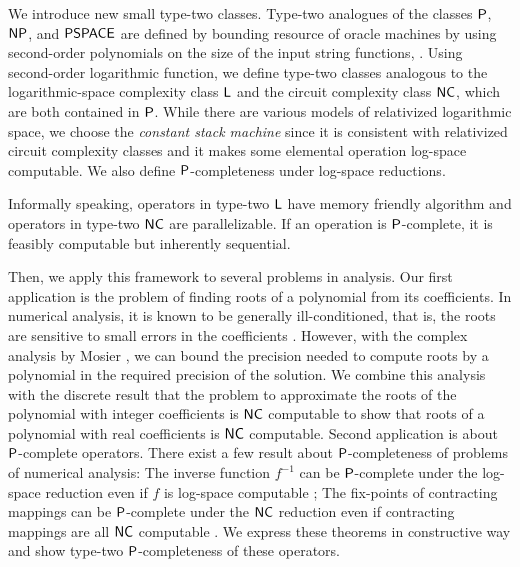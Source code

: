 \documentclass[envcountsame,orivec,oribibl]{llncs}
\begin{document}
We introduce new small type-two classes.
Type-two analogues of the classes $\mathsf{P}$, $\mathsf{NP}$, and $\mathsf{PSPACE}$
are defined by bounding resource of oracle machines by using 
second-order polynomials on the size of the input string functions,
\cite{kawamura2012complexity}.
Using second-order logarithmic function,
we define type-two classes analogous to the logarithmic-space 
complexity class $\mathsf{L}$ and the circuit complexity class $\mathsf{NC}$, 
which are both contained in $\mathsf{P}$.
While there are various models of relativized logarithmic space,
we choose the \emph{constant stack machine} \cite{aehlig2007relativizing} 
since it is consistent with relativized circuit complexity classes 
and it makes some elemental operation log-space computable.
We also define $\mathsf{P}$-completeness under log-space reductions.

Informally speaking, operators in type-two $\mathsf{L}$ have
memory friendly algorithm and operators in type-two $\mathsf{NC}$
are parallelizable.
If an operation is $\mathsf{P}$-complete,
it is feasibly computable but inherently sequential. 

Then, we apply this framework to several problems in analysis.
Our first application is the problem of finding roots of a polynomial 
from its coefficients.
In numerical analysis, it is known to be generally ill-conditioned, 
that is, the roots are sensitive to 
small errors in the coefficients \cite{wilkinson1963rounding}.
However, with the complex analysis by Mosier \cite{mosier1986root},
we can bound the precision needed to compute
roots by a polynomial in the required precision of the solution.
We combine this analysis with the discrete result 
that the problem to approximate the roots of the polynomial with integer 
coefficients is $\mathsf{NC}$ computable \cite{neff1994specified}
to show that roots of a polynomial with real coefficients
is $\mathsf{NC}$ computable.
Second application is about $\mathsf{P}$-complete operators.
There exist a few result about $\mathsf{P}$-completeness of problems of numerical analysis:
The inverse function $f^{-1}$ can be $\mathsf{P}$-complete under the log-space
reduction even if $f$ is log-space computable \cite{ko1991complexity};
The fix-points of contracting mappings can be $\mathsf{P}$-complete under the
$\mathsf{NC}$ reduction even if contracting mappings are all $\mathsf{NC}$ computable \cite{hoover1991real}.
We express these theorems in constructive way and
show type-two $\mathsf{P}$-completeness of these operators.
\end{document}

